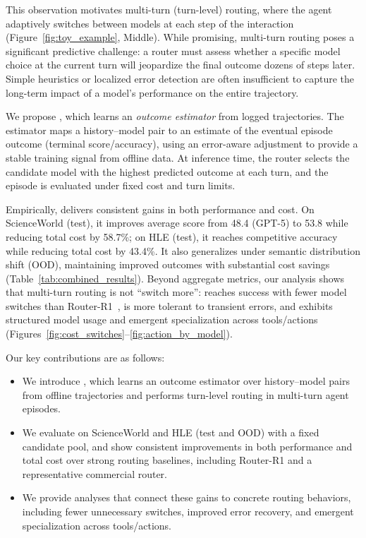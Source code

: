 This observation motivates multi-turn (turn-level) routing, where the agent adaptively switches between models at each step of the interaction (Figure~\ref{fig:toy_example}, Middle). While promising, multi-turn routing poses a significant predictive challenge: a router must assess whether a specific model choice at the current turn will jeopardize the final outcome dozens of steps later. Simple heuristics or localized error detection are often insufficient to capture the long-term impact of a model's performance on the entire trajectory.

We propose \textbf{\method}, which learns an \emph{outcome estimator} from logged trajectories.
The estimator maps a history--model pair to an estimate of the eventual episode outcome (terminal score/accuracy), using an error-aware adjustment to provide a stable training signal from offline data.
At inference time, the router selects the candidate model with the highest predicted outcome at each turn, and the episode is evaluated under fixed cost and turn limits.

Empirically, \method delivers consistent gains in both performance and cost.
On ScienceWorld (test), it improves average score from 48.4 (GPT-5) to 53.8 while reducing total cost by 58.7\%; on HLE (test), it reaches competitive accuracy while reducing total cost by 43.4\%.
It also generalizes under semantic distribution shift (OOD), maintaining improved outcomes with substantial cost savings (Table~\ref{tab:combined_results}).
Beyond aggregate metrics, our analysis shows that multi-turn routing is not ``switch more'': \method reaches success with fewer model switches than Router-R1~\cite{zhang2025router}, is more tolerant to transient errors, and exhibits structured model usage and emergent specialization across tools/actions (Figures~\ref{fig:cost_switches}--\ref{fig:action_by_model}).

Our key contributions are as follows:

\begin{itemize}[nolistsep, noitemsep, leftmargin=*]
\item We introduce \textbf{\method}, which learns an outcome estimator over history--model pairs from offline trajectories and performs turn-level routing in multi-turn agent episodes.
\item We evaluate on ScienceWorld and HLE (test and OOD) with a fixed candidate pool, and show consistent improvements in both performance and total cost over strong routing baselines, including Router-R1 and a representative commercial router.
\item We provide analyses that connect these gains to concrete routing behaviors, including fewer unnecessary switches, improved error recovery, and emergent specialization across tools/actions.
\end{itemize}